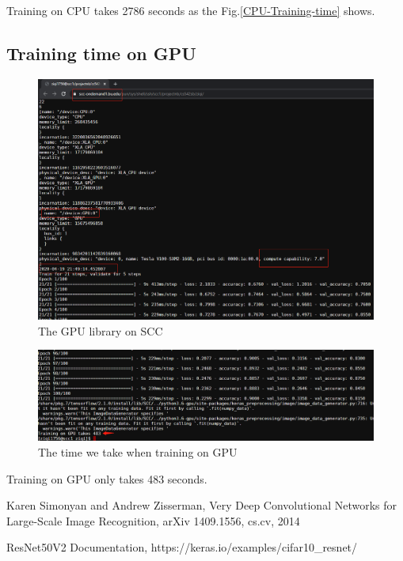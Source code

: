 \documentclass[a4paper,10pt]{article}
\begin{document}
Training on CPU takes 2786 seconds as the Fig.\ref{CPU-Training-time} shows.

\subsection{Training time on GPU}

\begin{figure}[H]
  \centering
  \includegraphics[width=14cm]{./images/GPU-lib.png}
     \caption{The GPU library on SCC
             }
        \label{GPU-lib}
\end{figure}

\begin{figure}[H]
  \centering
  \includegraphics[width=15cm]{./images/GPU-Training-time.png}
     \caption{The time we take when training on GPU
             }
        \label{GPU-Training-time}
\end{figure}

Training on GPU only takes 483 seconds.

\newpage
\begin{thebibliography}{}

   Karen Simonyan and Andrew Zisserman,
  Very Deep Convolutional Networks for Large-Scale Image Recognition,
  arXiv 1409.1556, cs.cv, 2014

   ResNet50V2 Documentation, https://keras.io/examples/cifar10\_resnet/

\end{thebibliography}
\end{document}
